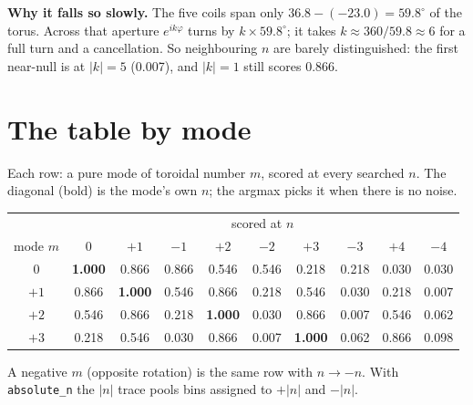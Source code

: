 \documentclass[11pt]{article}
\begin{document}
\textbf{Why it falls so slowly.} The five coils span only
$36.8-(-23.0)=59.8^\circ$ of the torus. Across that aperture $e^{ik\varphi}$
turns by $k\times 59.8^\circ$; it takes $k\approx 360/59.8\approx 6$ for a
full turn and a cancellation. So neighbouring $n$ are barely distinguished:
the first near-null is at $|k|=5$ (0.007), and $|k|=1$ still scores 0.866.

\section{The table by mode}
Each row: a pure mode of toroidal number $m$, scored at every searched $n$.
The diagonal (bold) is the mode's own $n$; the argmax picks it when there is
no noise.

\begin{center}\small
\begin{tabular}{c *{9}{c}}
\toprule
 & \multicolumn{9}{c}{scored at $n$}\\
mode $m$ & 0 & $+1$ & $-1$ & $+2$ & $-2$ & $+3$ & $-3$ & $+4$ & $-4$\\
\midrule
$0$ & \textbf{1.000} & 0.866 & 0.866 & 0.546 & 0.546 & 0.218 & 0.218 & 0.030 & 0.030 \\
$+1$ & 0.866 & \textbf{1.000} & 0.546 & 0.866 & 0.218 & 0.546 & 0.030 & 0.218 & 0.007 \\
$+2$ & 0.546 & 0.866 & 0.218 & \textbf{1.000} & 0.030 & 0.866 & 0.007 & 0.546 & 0.062 \\
$+3$ & 0.218 & 0.546 & 0.030 & 0.866 & 0.007 & \textbf{1.000} & 0.062 & 0.866 & 0.098 \\
\bottomrule
\end{tabular}
\end{center}
A negative $m$ (opposite rotation) is the same row with $n\to -n$.
With \texttt{absolute\_n} the $|n|$ trace pools bins assigned to $+|n|$ and $-|n|$.
\end{document}
